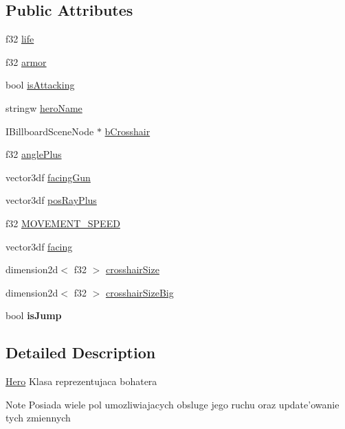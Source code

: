\subsection*{Public Attributes}
\begin{DoxyCompactItemize}
\item 
f32 \hyperlink{class_hero_a6ab09c62a1129609420943ddaea4ac50}{life}
\item 
f32 \hyperlink{class_hero_a73de3a70b8e660626bd6ba863b69f593}{armor}
\item 
bool \hyperlink{class_hero_aa1b8ba4fd9f005df0339019a4aea4727}{isAttacking}
\item 
stringw \hyperlink{class_hero_aaedb868881c5a1a38d862dade0e6e030}{heroName}
\item 
IBillboardSceneNode $\ast$ \hyperlink{class_hero_ae3dcb584303cef76dab909c103934655}{bCrosshair}
\item 
f32 \hyperlink{class_hero_a17831133c4588d6508d902e93a63cf05}{anglePlus}
\item 
vector3df \hyperlink{class_hero_abbb623e457418c1430c8838b46381166}{facingGun}
\item 
vector3df \hyperlink{class_hero_afac7e4e706ab911bd5d55c6afd8b43b0}{posRayPlus}
\item 
f32 \hyperlink{class_hero_aa56f0d2e5320927be5043d0f43c48c0e}{MOVEMENT\_\-SPEED}
\item 
vector3df \hyperlink{class_hero_a82afd40685996ca4de51159be95264d9}{facing}
\item 
dimension2d$<$ f32 $>$ \hyperlink{class_hero_a130a9079bc539aa7dda77f9dd52b93cf}{crosshairSize}
\item 
dimension2d$<$ f32 $>$ \hyperlink{class_hero_a27619bdf7c58a489c832cbb5566a1a83}{crosshairSizeBig}
\item 
\hypertarget{class_hero_ae570689e68a82c7698ca16013505c75d}{
bool {\bfseries isJump}}
\label{class_hero_ae570689e68a82c7698ca16013505c75d}

\end{DoxyCompactItemize}


\subsection{Detailed Description}
\hyperlink{class_hero}{Hero} Klasa reprezentujaca bohatera \begin{DoxyNote}{Note}
Posiada wiele pol umozliwiajacych obsluge jego ruchu oraz update'owanie tych zmiennych 
\end{DoxyNote}


